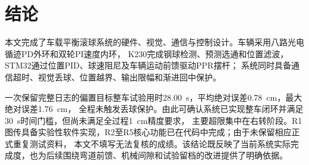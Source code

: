 \section{结论}

本文完成了车载平衡滚球系统的硬件、视觉、通信与控制设计。车辆采用八路光电循迹PD外环和双轮PI速度内环，
K230完成钢球检测、预测选通和位置滤波，STM32通过位置PID、球速阻尼及车辆运动前馈驱动PPR摆杆；
系统同时具备通信超时、视觉丢球、位置越界、输出限幅和渐进回中保护。

一次保留完整日志的偏置目标整车试验用时\SI{28.00}{s}，平均绝对误差\SI{0.78}{cm}，最大绝对误差\SI{1.76}{cm}，
全程未触发丢球保护。由此可确认系统已实现整车闭环并满足\SI{30}{s}时间门槛，但尚未满足全过程\SI{1}{cm}精度要求，
主要超限集中在右转阶段。R1图传具备实验性软件实现，R2至R5核心功能已在代码中完成；由于未保留相应正式重复测试资料，
本文不填写无法复核的成绩。该结论既反映了当前系统实际完成度，也为后续围绕弯道前馈、机械间隙和试验留档的改进提供了明确依据。
